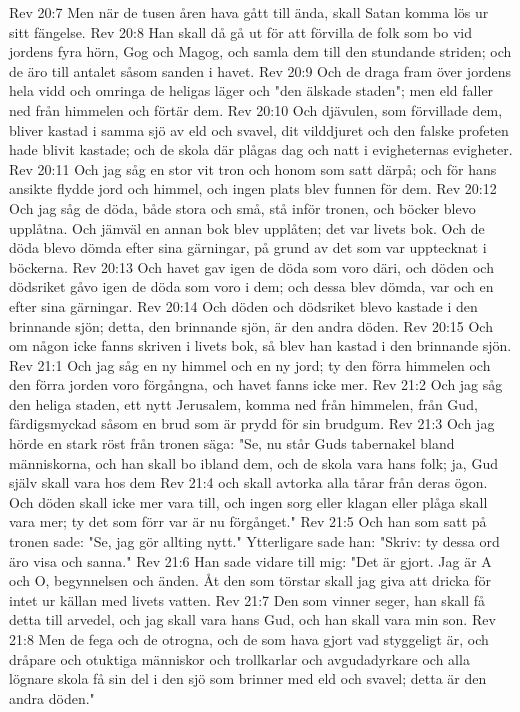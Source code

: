 Rev 20:7  Men när de tusen åren hava gått till ända, skall Satan komma lös ur sitt fängelse.
Rev 20:8  Han skall då gå ut för att förvilla de folk som bo vid jordens fyra hörn, Gog och Magog, och samla dem till den stundande striden; och de äro till antalet såsom sanden i havet.
Rev 20:9  Och de draga fram över jordens hela vidd och omringa de heligas läger och "den älskade staden"; men eld faller ned från himmelen och förtär dem.
Rev 20:10  Och djävulen, som förvillade dem, bliver kastad i samma sjö av eld och svavel, dit vilddjuret och den falske profeten hade blivit kastade; och de skola där plågas dag och natt i evigheternas evigheter.
Rev 20:11  Och jag såg en stor vit tron och honom som satt därpå; och för hans ansikte flydde jord och himmel, och ingen plats blev funnen för dem.
Rev 20:12  Och jag såg de döda, både stora och små, stå inför tronen, och böcker blevo upplåtna. Och jämväl en annan bok blev upplåten; det var livets bok. Och de döda blevo dömda efter sina gärningar, på grund av det som var upptecknat i böckerna.
Rev 20:13  Och havet gav igen de döda som voro däri, och döden och dödsriket gåvo igen de döda som voro i dem; och dessa blev dömda, var och en efter sina gärningar.
Rev 20:14  Och döden och dödsriket blevo kastade i den brinnande sjön; detta, den brinnande sjön, är den andra döden.
Rev 20:15  Och om någon icke fanns skriven i livets bok, så blev han kastad i den brinnande sjön.
Rev 21:1  Och jag såg en ny himmel och en ny jord; ty den förra himmelen och den förra jorden voro förgångna, och havet fanns icke mer.
Rev 21:2  Och jag såg den heliga staden, ett nytt Jerusalem, komma ned från himmelen, från Gud, färdigsmyckad såsom en brud som är prydd för sin brudgum.
Rev 21:3  Och jag hörde en stark röst från tronen säga: "Se, nu står Guds tabernakel bland människorna, och han skall bo ibland dem, och de skola vara hans folk; ja, Gud själv skall vara hos dem
Rev 21:4  och skall avtorka alla tårar från deras ögon. Och döden skall icke mer vara till, och ingen sorg eller klagan eller plåga skall vara mer; ty det som förr var är nu förgånget."
Rev 21:5  Och han som satt på tronen sade: "Se, jag gör allting nytt." Ytterligare sade han: "Skriv: ty dessa ord äro visa och sanna."
Rev 21:6  Han sade vidare till mig: "Det är gjort. Jag är A och O, begynnelsen och änden. Åt den som törstar skall jag giva att dricka för intet ur källan med livets vatten.
Rev 21:7  Den som vinner seger, han skall få detta till arvedel, och jag skall vara hans Gud, och han skall vara min son.
Rev 21:8  Men de fega och de otrogna, och de som hava gjort vad styggeligt är, och dråpare och otuktiga människor och trollkarlar och avgudadyrkare och alla lögnare skola få sin del i den sjö som brinner med eld och svavel; detta är den andra döden."
